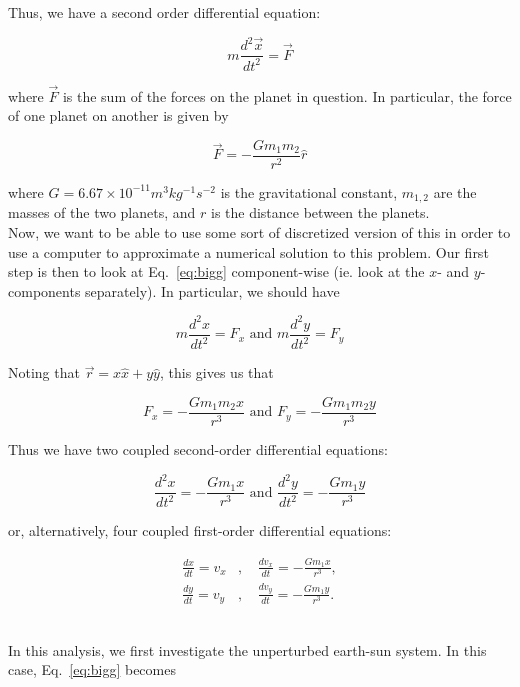 \documentclass[12pt]{article}
\numberwithin{equation}{section}
\begin{document}
\noindent Thus, we have a second order differential equation:

$$m\frac{d^{2}\vec{x}}{dt^{2}} = \vec{F}$$

\noindent where $\vec{F}$ is the sum of the forces on the planet in question.  In particular, the force of one planet on another is given by

\begin{equation}
\label{eq:bigg}
\vec{F} = -\frac{Gm_{1}m_{2}}{r^{2}}\hat{r}
\end{equation}

\noindent where $G = 6.67\times10^{-11} m^{3}kg^{-1}s^{-2}$ is the gravitational constant, $m_{1,2}$ are the masses of the two planets, and $r$ is the distance between the planets.
\\\indent Now, we want to be able to use some sort of discretized version of this in order to use a computer to approximate a numerical solution to this problem.  Our first step is then to look at Eq.~\ref{eq:bigg} component-wise (ie. look at the $x$- and $y$- components separately).  In particular, we should have

$$
m\frac{d^{2}x}{dt^{2}} = F_{x} \text{ and } m\frac{d^{2}y}{dt^{2}} = F_{y}
$$

\noindent Noting that $\vec{r}=x\hat{x}+y\hat{y}$, this gives us that

$$
F_{x} = -\frac{Gm_{1}m_{2}x}{r^{3}}\text{ and } F_{y} = -\frac{Gm_{1}m_{2}y}{r^{3}}
$$

\noindent Thus we have two coupled second-order differential equations:

\begin{equation}
\label{eq:diffeqs1}
\frac{d^{2}x}{dt^{2}} = -\frac{Gm_{1}x}{r^{3}}\text{ and } \frac{d^{2}y}{dt^{2}} = -\frac{Gm_{1}y}{r^{3}}
\end{equation}

\noindent or, alternatively, four coupled first-order differential equations:

\begin{equation}
\label{eq:diffeqs2}
\begin{align}
\frac{dx}{dt} = v_{x} &\text{, }&\frac{dv_{x}}{dt}=-\frac{Gm_{1}x}{r^{3}}, \\
\frac{dy}{dt} = v_{y} &\text{, }&\frac{dv_{y}}{dt}=-\frac{Gm_{1}y}{r^{3}}.
\end{align}
\end{equation}

\\\indent In this analysis, we first investigate the unperturbed earth-sun system.  In this case, Eq.~\ref{eq:bigg} becomes
\end{document}
